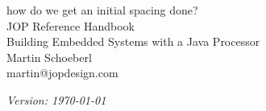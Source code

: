 
\begin{center}
how do we get an initial spacing done?\\
{\Large
\bigskip
\bigskip
\bigskip
\bigskip
{\huge JOP Reference Handbook\\
\bigskip \bigskip
\Large Building Embedded Systems with a Java Processor} \\
\bigskip
\bigskip
\bigskip
\bigskip
} {\sc Martin Schoeberl\\}
\medskip
martin@jopdesign.com\\
\medskip
\bigskip
\bigskip
\bigskip



\pagestyle{empty} \emph{Version: \today}
\end{center}

\cleardoublepage %
